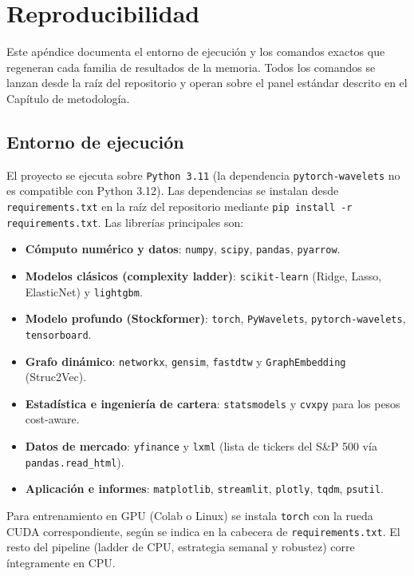 \chapter{Reproducibilidad}\label{ap:repro}

Este apéndice documenta el entorno de ejecución y los comandos exactos que
regeneran cada familia de resultados de la memoria. Todos los comandos se lanzan
desde la raíz del repositorio y operan sobre el panel estándar descrito en el
Capítulo de metodología.

\section{Entorno de ejecución}

El proyecto se ejecuta sobre \texttt{Python 3.11} (la dependencia
\texttt{pytorch-wavelets} no es compatible con Python 3.12). Las dependencias se
instalan desde \texttt{requirements.txt} en la raíz del repositorio mediante
\texttt{pip install -r requirements.txt}. Las librerías principales son:

\begin{itemize}
  \item \textbf{Cómputo numérico y datos}: \texttt{numpy}, \texttt{scipy},
        \texttt{pandas}, \texttt{pyarrow}.
  \item \textbf{Modelos clásicos (complexity ladder)}: \texttt{scikit-learn}
        (Ridge, Lasso, ElasticNet) y \texttt{lightgbm}.
  \item \textbf{Modelo profundo (Stockformer)}: \texttt{torch},
        \texttt{PyWavelets}, \texttt{pytorch-wavelets}, \texttt{tensorboard}.
  \item \textbf{Grafo dinámico}: \texttt{networkx}, \texttt{gensim},
        \texttt{fastdtw} y \texttt{GraphEmbedding} (Struc2Vec).
  \item \textbf{Estadística e ingeniería de cartera}: \texttt{statsmodels} y
        \texttt{cvxpy} para los pesos cost-aware.
  \item \textbf{Datos de mercado}: \texttt{yfinance} y \texttt{lxml}
        (lista de tickers del S\&P 500 vía \texttt{pandas.read\_html}).
  \item \textbf{Aplicación e informes}: \texttt{matplotlib},
        \texttt{streamlit}, \texttt{plotly}, \texttt{tqdm}, \texttt{psutil}.
\end{itemize}

Para entrenamiento en GPU (Colab o Linux) se instala \texttt{torch} con la rueda
CUDA correspondiente, según se indica en la cabecera de \texttt{requirements.txt}.
El resto del pipeline (ladder de CPU, estrategia semanal y robustez) corre
íntegramente en CPU.

